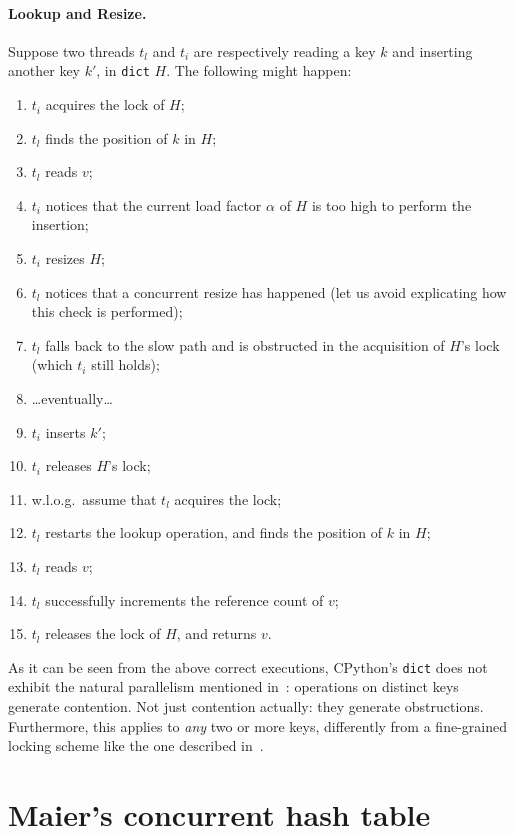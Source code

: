 \paragraph{Lookup and Resize.}
Suppose two threads $t_l$ and $t_i$ are respectively reading a key $k$ and inserting another key $k'$, in \texttt{dict} $H$.
The following might happen:
\begin{enumerate}
	\item $t_i$ acquires the lock of $H$;
	\item $t_l$ finds the position of $k$ in $H$;
	\item $t_l$ reads $v$;
	\item $t_i$ notices that the current load factor $\alpha$ of $H$ is too high to perform the insertion;
	\item $t_i$ resizes $H$;
	\item $t_l$ notices that a concurrent resize has happened (let us avoid explicating how this check is performed);
	\item $t_l$ falls back to the slow path and is obstructed in the acquisition of $H$'s lock (which $t_i$ still holds);
	\item {\ldots}eventually{\ldots}
	\item $t_i$ inserts $k'$;
	\item $t_i$ releases $H$'s lock;
	\item w.l.o.g.\ assume that $t_l$ acquires the lock;
	\item $t_l$ restarts the lookup operation, and finds the position of $k$ in $H$;
	\item $t_l$ reads $v$;
	\item $t_l$ successfully increments the reference count of $v$;
	\item $t_l$ releases the lock of $H$, and returns $v$.
\end{enumerate}

As it can be seen from the above correct executions, CPython's \texttt{dict} does not exhibit the natural parallelism mentioned in~\cite[Chapter 13]{art-mp}: operations on distinct keys generate contention.
Not just contention actually: they generate obstructions.
Furthermore, this applies to \emph{any} two or more keys, differently from a fine-grained locking scheme like the one described in~\cite[\S13.2.2]{art-mp}.


\section{Maier's concurrent hash table}\label{sec:maier-review}

